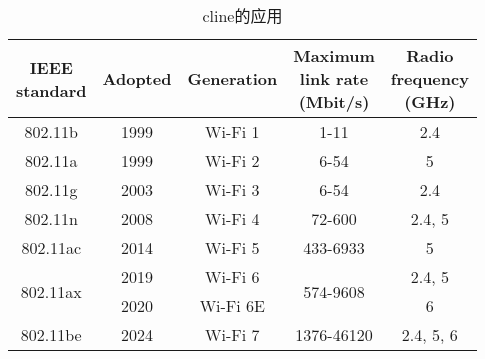 \documentclass[UTF8,fontset=ubuntu]{ctexart}
\begin{document}
\begin{table}
\centering
\begin{tabular}{|c|c|c|c|c|}
    \hline
    \makecell{IEEE\\ standard} & Adopted & Generation & \makecell{Maximum\\ link rate\\(Mbit/s)} & \makecell{Radio\\ frequency\\ (GHz)}\\
    \hline
    802.11b & 1999 & Wi-Fi 1 & 1-11 & 2.4\\
    \hline
    802.11a & 1999 & Wi-Fi 2 & 6-54 & 5\\
    \hline
    802.11g & 2003 & Wi-Fi 3 & 6-54 & 2.4\\
    \hline
    802.11n & 2008 & Wi-Fi 4 & 72-600 & 2.4, 5\\
    \hline
    802.11ac & 2014 & Wi-Fi 5 & 433-6933 & 5\\
    \hline
    \multirow{2}{*}{802.11ax} & 2019 & Wi-Fi 6 & \multirow{2}{*}{574-9608} & 2.4, 5\\
    \cline{2-3}
    \cline{5-5}
    & 2020 & Wi-Fi 6E & & 6\\
    \hline
    802.11be & \cellcolor[gray]{0.8}2024 & Wi-Fi 7 & 1376-46120 & 2.4, 5, 6\\
    \hline
\end{tabular}
\caption{\\cline的应用}
\end{table}
\end{document}
